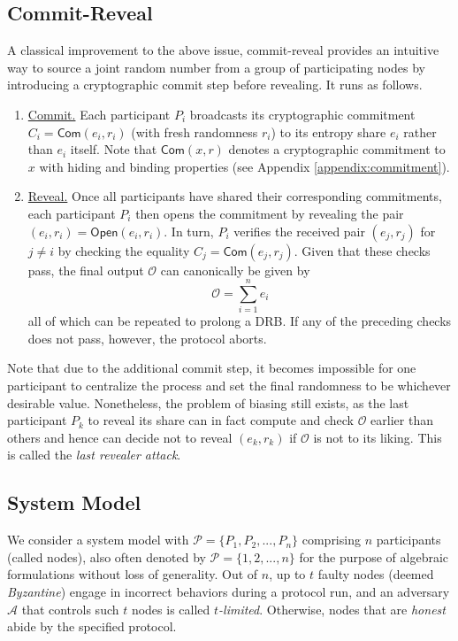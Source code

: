 \documentclass[letterpaper,twocolumn,10pt]{article}
\theoremstyle{definition}
\theoremstyle{remark}
\begin{document}
\subsection{Commit-Reveal}
\label{subsection:commit-reveal}
A classical improvement to the above issue, commit-reveal provides an intuitive way to source a joint random number from a group of participating nodes by introducing a cryptographic commit step before revealing. It runs as follows.
\begin{enumerate}
\item \underline{Commit.} Each participant $P_i$ broadcasts its cryptographic commitment $C_i = \mathsf{Com}(e_i, r_i)$ (with fresh randomness $r_i$) to its entropy share $e_i$ rather than $e_i$ itself. Note that $\mathsf{Com}(x, r)$ denotes a cryptographic commitment to $x$ with hiding and binding properties (see Appendix \ref{appendix:commitment}).
\item \underline{Reveal.} Once all participants have shared their corresponding commitments, each participant $P_i$ then opens the commitment by revealing the pair $(e_i, r_i) = \mathsf{Open}(e_i, r_i)$. In turn, $P_i$ verifies the received pair $(e_j, r_j)$ for $j \neq i$ by checking the equality $C_j = \mathsf{Com}(e_j, r_j)$. Given that these checks pass, the final output $\mathcal{O}$ can canonically be given by
\[
\mathcal{O} = \sum_{i = 1}^n e_i
\]
all of which can be repeated to prolong a DRB. If any of the preceding checks does not pass, however, the protocol aborts.
\end{enumerate}

Note that due to the additional commit step, it becomes impossible for one participant to centralize the process and set the final randomness to be whichever desirable value. Nonetheless, the problem of biasing still exists, as the last participant $P_k$ to reveal its share can in fact compute and check $\mathcal{O}$ earlier than others and hence can decide not to reveal $(e_k, r_k)$ if $\mathcal{O}$ is not to its liking. This is called the \textit{last revealer attack}.

\subsection{System Model}
We consider a system model with $\mathcal{P} = \{P_1, P_2, ..., P_n\}$ comprising $n$ participants (called nodes), also often denoted by $\mathcal{P} = \{1, 2, ..., n\}$ for the purpose of algebraic formulations without loss of generality. Out of $n$, up to $t$ faulty nodes (deemed \textit{Byzantine}) engage in incorrect behaviors during a protocol run, and an adversary $\mathcal{A}$ that controls such $t$ nodes is called \textit{$t$-limited}. Otherwise, nodes that are \textit{honest} abide by the specified protocol.
\end{document}
